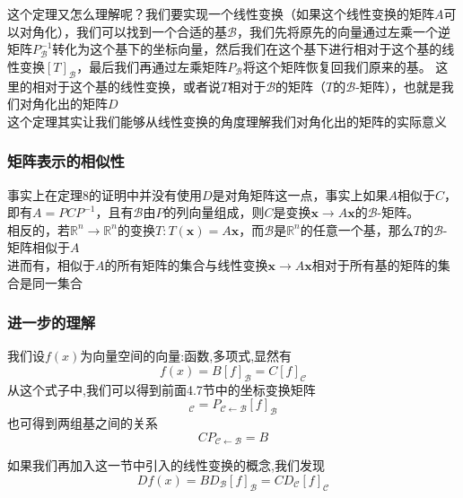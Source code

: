 \documentclass{article}
\newcommand{\ve}{\boldsymbol}
\begin{document}
\begin{CJK}{UTF8}{gkai}
这个定理又怎么理解呢？我们要实现一个线性变换（如果这个线性变换的矩阵$A$可以对角化），我们可以找到一个合适的基$\mathcal{B}$，我们先将原先的向量通过左乘一个逆矩阵$P_{\mathcal{B}}^{-1}$转化为这个基下的坐标向量，然后我们在这个基下进行相对于这个基的线性变换$[T]_{\mathcal{B}}$，最后我们再通过左乘矩阵$P_{\mathcal{B}}$将这个矩阵恢复回我们原来的基。
这里的相对于这个基的线性变换，或者说$T$相对于$\mathcal{B}$的矩阵（$T$的$\mathcal{B}$-矩阵），也就是我们对角化出的矩阵$D$\\

这个定理其实让我们能够从线性变换的角度理解我们对角化出的矩阵的实际意义\\

\subsubsection{矩阵表示的相似性}
事实上在定理8的证明中并没有使用$D$是对角矩阵这一点，事实上如果$A$相似于$C$，即有$A=PCP^{-1}$，且有$\mathcal{B}$由$P$的列向量组成，则$C$是变换$\ve{x}\to A\ve{x}$的$\mathcal{B}$-矩阵。\\

相反的，若$\mathbb{R}^n\to \mathbb{R}^n$的变换$T:T(\ve{x})=A\ve{x}$，而$\mathcal{B}$是$\mathbb{R}^n$的任意一个基，那么$T$的$\mathcal{B}$-矩阵相似于$A$\\

进而有，相似于$A$的所有矩阵的集合与线性变换$\ve{x}\to A\ve{x}$相对于所有基的矩阵的集合是同一集合\\

\subsubsection{进一步的理解}
我们设$f(x)$为向量空间的向量:函数,多项式,显然有
\begin{equation}
    f(x) = B [f]_{\mathcal{B}} = C [f]_{\mathcal{C}}
\end{equation}
从这个式子中,我们可以得到前面4.7节中的坐标变换矩阵
\begin{equation}
    [f]_{\mathcal{C}} = P_{\mathcal{C}\leftarrow\mathcal{B}} [f]_{\mathcal{B}}
\end{equation}
也可得到两组基之间的关系
\begin{equation}
    C P_{\mathcal{C}\leftarrow\mathcal{B}} = B
\end{equation}

如果我们再加入这一节中引入的线性变换的概念,我们发现
\begin{equation}
    D f(x) = B D_{\mathcal{B}} [f]_{\mathcal{B}} = C D_{\mathcal{C}} [f]_{\mathcal{C}}
\end{equation}

\end{CJK}
\end{document}
